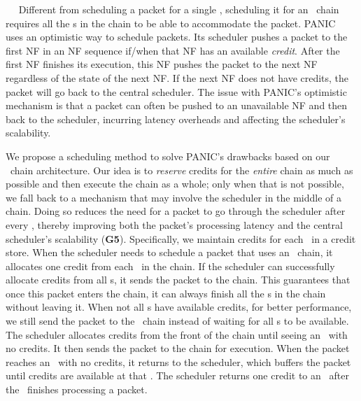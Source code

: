 ~~
Different from scheduling a packet for a single \nt, scheduling it for an \nt\ chain requires all the \nt{}s in the chain to be able to accommodate the packet.
PANIC~\cite{panic-osdi20} uses an optimistic way to schedule packets.
Its scheduler pushes a packet to the first NF in an NF sequence if/when that NF has an available {\em credit}.
After the first NF finishes its execution, this NF pushes the packet to the next NF regardless of the state of the next NF. 
If the next NF does not have credits, the packet will go back to the central scheduler.
The issue with PANIC's optimistic mechanism is that a packet can often be pushed to an unavailable NF and then back to the scheduler, incurring latency overheads and affecting the scheduler's scalability.

We propose a scheduling method to solve PANIC's drawbacks based on our \nt\ chain architecture.
Our idea is to {\em reserve} credits for the {\em entire} chain as much as possible and then execute the chain as a whole; only when that is not possible, we fall back to a mechanism that may involve the scheduler in the middle of a chain. 
Doing so reduces the need for a packet to go through the scheduler after every \nt, thereby improving both the packet's processing latency and the central scheduler's scalability (\textbf{G5}).
Specifically, we maintain credits for each \nt\ in a credit store. %
When the scheduler needs to schedule a packet that uses an \nt\ chain, it allocates one credit from each \nt\ in the chain.
If the scheduler can successfully allocate credits from all \nt{}s, it sends the packet to the chain.
This guarantees that once this packet enters the chain, it can always finish all the \nt{}s in the chain without leaving it.
When not all \nt{}s have available credits, for better performance, we still send the packet to the \nt\ chain instead of waiting for all \nt{}s to be available. The scheduler allocates credits from the front of the chain until seeing an \nt\ with no credits. It then sends the packet to the chain for execution.
When the packet reaches an \nt\ with no credits, it returns to the scheduler, which buffers the packet until credits are available at that \nt.
The scheduler returns one credit to an \nt\ after the \nt\ finishes processing a packet.

